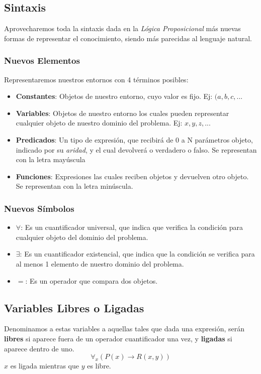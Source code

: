 \subsection{Sintaxis}
\noindent Aprovecharemos toda la sintaxis dada en la \textit{Lógica Proposicional} más nuevas formas de representar el conocimiento, siendo más parecidas al lenguaje natural.
\subsubsection{Nuevos Elementos}
\noindent Representaremos nuestros entornos con 4 términos posibles:
\begin{itemize}
        \item \textbf{Constantes}: Objetos de nuestro entorno, cuyo valor es fijo. Ej: \((a,b,c,...\)
        \item \textbf{Variables}: Objetos de nuestro entorno los cuales pueden representar cualquier objeto de nuestro dominio del problema. Ej: \(x,y,z,...\)
        \item \textbf{Predicados}: Un tipo de expresión, que recibirá de 0 a N parámetros objeto, indicado por su \textit{aridad}, y el cual devolverá o verdadero o falso. Se representan con la letra mayúscula
        \item \textbf{Funciones}: Expresiones las cuales reciben objetos y devuelven otro objeto. Se representan con la letra minúscula.
\end{itemize}
\subsubsection{Nuevos Símbolos}
\begin{itemize}
        \item \(\forall\): Es un cuantificador universal, que indica que verifica la condición para cualquier objeto del dominio del problema.
        \item \(\exists\): Es un cuantificador existencial, que indica que la condición se verifica para al menos 1 elemento de nuestro dominio del problema.
        \item \(=\): Es un operador que compara dos objetos.
\end{itemize}
\subsection{Variables Libres o Ligadas}
\noindent Denominamos a estas variables a aquellas tales que dada una expresión, serán \textbf{libres} si aparece fuera de un operador cuantificador una vez, y \textbf{ligadas} si aparece dentro de uno.
\[\forall_x (P(x) \rightarrow R(x,y))\]
\noindent \(x\) es ligada mientras que \(y\) es libre.

